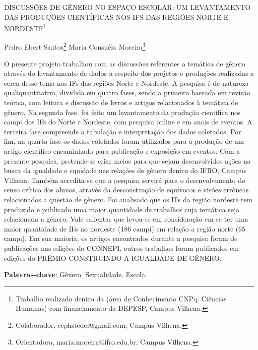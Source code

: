 \documentclass[article,12pt,onesidea,4paper,english,brazil]{abntex2}
\begin{document}
	
	
	\frenchspacing 
	
	\begin{center}
		\LARGE DISCUSSÕES DE GÊNERO NO ESPAÇO ESCOLAR: UM LEVANTAMENTO DAS PRODUÇÕES CIENTÍFICAS NOS IFS DAS REGIÕES NORTE E NORDESTE\footnote{Trabalho realizado dentro da (área de Conhecimento CNPq: Ciências Humanas) com financiamento da DEPESP, Campus Vilhena.}
		
		\normalsize
		Pedro Ebert Santos\footnote{Colaborador, cephstedel@gmail.com, Campus Vilhena.} 
		Maria Consuêlo Moreira\footnote{Orientadora, maria.moreira@ifro.edu.br, Campus Vilhena.} 
		
	\end{center}
	
	\noindent O presente projeto trabalhou com as discussões referentes a temática de gênero através do levantamento de dados a respeito dos projetos e produções realizadas a cerca desse tema nos IFs das regiões Norte e Nordeste. A pesquisa é de natureza qualiquantitativa, dividida em quatro fases, sendo a primeira baseada em revisão teórica, com leitura e discussão de livros e artigos relacionados à temática de gênero. Na segunda fase, foi feito um levantamento da produção científica nos campi dos IFs do Norte e Nordeste, com pesquisa online e em anais de eventos. A terceira fase compreende a tabulação e interpretação dos dados coletados. Por fim, na quarta fase os dados coletados foram utilizados para a produção de um artigo científico encaminhado para publicação e exposição em eventos. Com a presente pesquisa, pretende-se criar meios para que sejam desenvolvidos ações na busca da igualdade e equidade nas relações de gênero dentro do IFRO, Campus Vilhena. Também acredita-se que a pesquisa servirá para o desenvolvimento do senso crítico dos alunos, através da desconstrução de equívocos e visões errôneas relacionados a questão de gênero. Foi analisado que os IFs da região nordeste tem produzido e publicado uma maior quantidade de trabalhos cuja temática seja relacionada a gênero. Vale salientar que levou-se em consideração em se ter uma maior quantidade de IFs no nordeste (186 campi) em relação a região norte (65 campi). Em sua maioria, os artigos encontrados durante a pesquisa foram de publicações nas edições do CONNEPI, outros trabalhos foram publicados em edições do PRÊMIO CONSTRUINDO A IGUALDADE DE GÊNERO.
	
	\vspace{\onelineskip}
	
	\noindent
	\textbf{Palavras-chave}: Gênero. Sexualidade. Escola.
	
\end{document}
